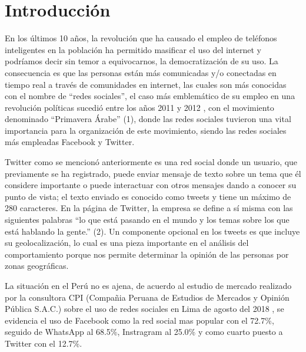 \chapter{Introducci\'on}

En los últimos 10 años, la revolución que ha causado el empleo de teléfonos inteligentes en la población 
ha permitido masificar el uso del internet y podríamos decir sin temor a equivocarnos, la democratización de su uso.
 La consecuencia es que las personas están más comunicadas y/o conectadas en tiempo real a través  de comunidades 
 en internet, las cuales son más conocidas con el nombre de “redes sociales”, el caso más emblemático de su empleo 
 en una revolución políticas sucedió entre los años 2011 y 2012 , con el movimiento denominado  “Primavera Árabe” (1), 
 donde las redes sociales tuvieron una vital importancia para la organización de este movimiento, siendo las redes 
 sociales más empleadas Facebook y Twitter. 
      
Twitter como se mencionó anteriormente es una red social donde un usuario, que previamente se ha registrado, 
puede enviar mensaje de texto sobre un tema que él considere importante o puede interactuar con otros mensajes 
dando a conocer su punto de vista; el texto enviado es conocido como tweets y tiene un máximo de 280 caracteres. 
En la página de Twitter, la empresa se define a sí misma con las siguientes palabras “lo que está pasando en el 
mundo y los temas sobre los que está hablando la gente.” (2). Un componente opcional en los tweets es que incluye 
su geolocalización, lo cual es una pieza importante en el análisis del comportamiento porque nos permite determinar 
la opinión de las personas por zonas geográficas. 

La situaci\'on en el Per\'u no es ajena, de acuerdo al estudio de mercado realizado por la consultora CPI (Compa\~nia Peruana de Estudios de Mercados y Opini\'on P\'ublica S.A.C.) sobre el uso de redes sociales en Lima de agosto del 2018 , se evidencia el uso de Facebook como la red social mas popular con el 72.7\%, seguido de WhatsApp al 68.5\%, Instragram al 25.0\% y como cuarto puesto a Twitter con el 12.7\%. 



